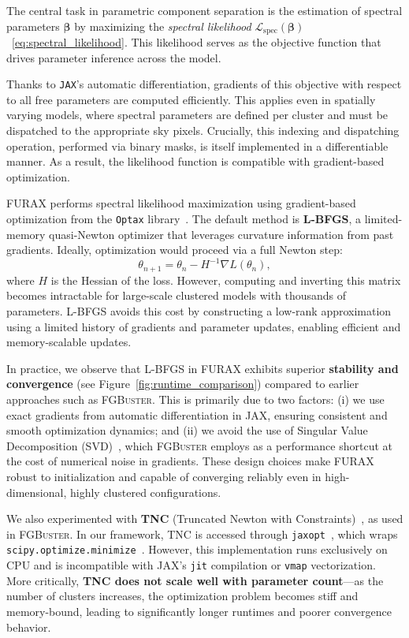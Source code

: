 \documentclass[%
 reprint,
bibnotes,
 amsmath,amssymb,
 aps,
floatfix, 
]{revtex4-2}
\begin{document}
The central task in parametric component separation is the estimation of spectral parameters \( \boldsymbol{\beta} \) by maximizing the \textit{spectral likelihood} \( \mathcal{L}_{\mathrm{spec}}(\boldsymbol{\beta}) \)~\eqref{eq:spectral_likelihood}. This likelihood serves as the objective function that drives parameter inference across the model.

Thanks to \texttt{JAX}'s automatic differentiation, gradients of this objective with respect to all free parameters are computed efficiently. This applies even in spatially varying models, where spectral parameters are defined per cluster and must be dispatched to the appropriate sky pixels. Crucially, this indexing and dispatching operation, performed via binary masks, is itself implemented in a differentiable manner. As a result, the likelihood function is compatible with gradient-based optimization.

\textsc{FURAX} performs spectral likelihood maximization using gradient-based optimization from the \texttt{Optax} library~\citep{optax}. The default method is \textbf{L-BFGS}, a limited-memory quasi-Newton optimizer that leverages curvature information from past gradients. Ideally, optimization would proceed via a full Newton step:
\begin{equation}
    \theta_{n+1} = \theta_n - H^{-1} \nabla L(\theta_n),
\end{equation}
where \( H \) is the Hessian of the loss. However, computing and inverting this matrix becomes intractable for large-scale clustered models with thousands of parameters. L-BFGS avoids this cost by constructing a low-rank approximation using a limited history of gradients and parameter updates, enabling efficient and memory-scalable updates.

In practice, we observe that L-BFGS in \textsc{FURAX} exhibits superior \textbf{stability and convergence} (see Figure~\ref{fig:runtime_comparison}) compared to earlier approaches such as \textsc{FGBuster}. This is primarily due to two factors: (i) we use exact gradients from automatic differentiation in JAX, ensuring consistent and smooth optimization dynamics; and (ii) we avoid the use of Singular Value Decomposition (SVD)~\citep{SVD}, which \textsc{FGBuster} employs as a performance shortcut at the cost of numerical noise in gradients. These design choices make \textsc{FURAX} robust to initialization and capable of converging reliably even in high-dimensional, highly clustered configurations.

We also experimented with \textbf{TNC} (Truncated Newton with Constraints)~\citep{TNC}, as used in \textsc{FGBuster}. In our framework, TNC is accessed through \texttt{jaxopt}~\citep{jaxopt}, which wraps \texttt{scipy.optimize.minimize}~\citep{scipy}. However, this implementation runs exclusively on CPU and is incompatible with JAX’s \texttt{jit} compilation or \texttt{vmap} vectorization. More critically, \textbf{TNC does not scale well with parameter count}---as the number of clusters increases, the optimization problem becomes stiff and memory-bound, leading to significantly longer runtimes and poorer convergence behavior.
\end{document}
